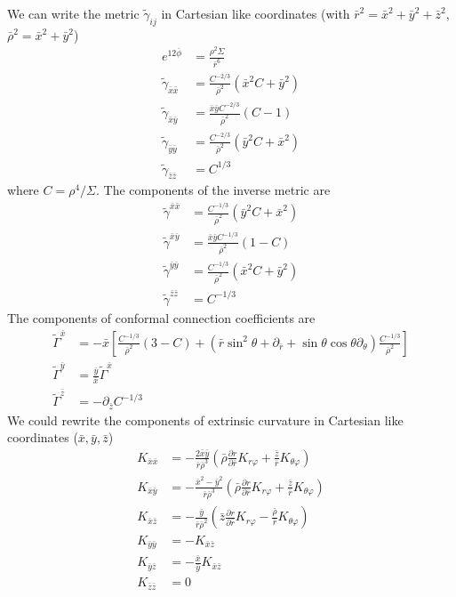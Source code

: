 \documentclass[prd]{revtex4}
\begin{document}
We can write the metric $\tilde{\gamma}_{ij}$ in Cartesian like coordinates (with $\bar{r}^2 = \bar{x}^2+\bar{y}^2 + \bar{z}^2$, $\bar{\rho}^2= \bar{x}^2+\bar{y}^2$)
\begin{align}
e^{12 \bar{\phi}} &= \frac{\rho^2 \Sigma}{\bar{r}^6} \\
\tilde{\gamma}_{\bar{x} \bar{x}} &=\frac{C^{-2/3}}{\bar{\rho}^2} (\bar{x}^2 C + \bar{y}^2) \\
\tilde{\gamma}_{\bar{x} \bar{y}} &=\frac{\bar{x} \bar{y} C^{-2/3}}{\bar{\rho}^2} (C-1) \\
\tilde{\gamma}_{\bar{y} \bar{y}} &=\frac{C^{-2/3}}{\bar{\rho}^2} (\bar{y}^2 C + \bar{x}^2)\\
\tilde{\gamma}_{\bar{z} \bar{z}} &=C^{1/3}
\end{align}
where $C = \rho^4/\Sigma$. The components of the inverse metric are
\begin{align}
\tilde{\gamma}^{\bar{x} \bar{x}} &=\frac{C^{-1/3}}{\bar{\rho}^2} (\bar{y}^2 C + \bar{x}^2) \\
\tilde{\gamma}^{\bar{x} \bar{y}} &=\frac{\bar{x} \bar{y} C^{-1/3}}{\bar{\rho}^2} (1- C) \\
\tilde{\gamma}^{\bar{y} \bar{y}} &=\frac{C^{-1/3}}{\bar{\rho}^2} (\bar{x}^2 C + \bar{y}^2)\\
\tilde{\gamma}^{\bar{z} \bar{z}} &=C^{-1/3}
\end{align}
The components of conformal connection coefficients are
\begin{align}
\tilde{\Gamma}^{\bar{x}} &= -\bar{x} \left[\frac{C^{-1/3}}{\bar{\rho}^2}(3-C) + (\bar{r} \sin^2 \theta + \partial_{\bar{r}} + \sin \theta \cos \theta \partial_\theta)\frac{C^{-1/3}}{\bar{\rho}^2} \right] \\
\tilde{\Gamma}^{\bar{y}} &= \frac{\bar{y}}{\bar{x}} \tilde{\Gamma}^{\bar{x}} \\
\tilde{\Gamma}^{\bar{z}} &= - \partial_{\bar{z}} C^{-1/3}
\end{align}
We could rewrite the components of extrinsic curvature in Cartesian like coordinates ($\bar{x}, \bar{y}, \bar{z}$)
\begin{align}
K_{\bar{x} \bar{x}} &= - \frac{2 \bar{x} \bar{y}}{\bar{r} \bar{\rho}^3} \left(\bar{\rho} \frac{\partial r}{\partial \bar{r}} K_{r \varphi} + \frac{\bar{z}}{\bar{r}} K_{\theta \varphi} \right)\\
K_{\bar{x} \bar{y}} &= - \frac{\bar{x}^2 - \bar{y}^2}{\bar{r} \bar{\rho}^3} \left(\bar{\rho} \frac{\partial r}{\partial \bar{r}} K_{r \varphi} + \frac{\bar{z}}{\bar{r}} K_{\theta \varphi} \right)\\
K_{\bar{x} \bar{z}} &= - \frac{\bar{y}}{\bar{r} \bar{\rho}^2} \left(\bar{z} \frac{\partial r}{\partial \bar{r}} K_{r \varphi} -\frac{\bar{\rho}}{\bar{r}} K_{\theta \varphi} \right)\\
K_{\bar{y} \bar{y}} &= -K_{\bar{x} \bar{z}} \\
K_{\bar{y} \bar{z}} &= -\frac{\bar{x}}{\bar{y}} K_{\bar{x} \bar{z}} \\
K_{\bar{z} \bar{z}} &= 0
\end{align}
\end{document}
